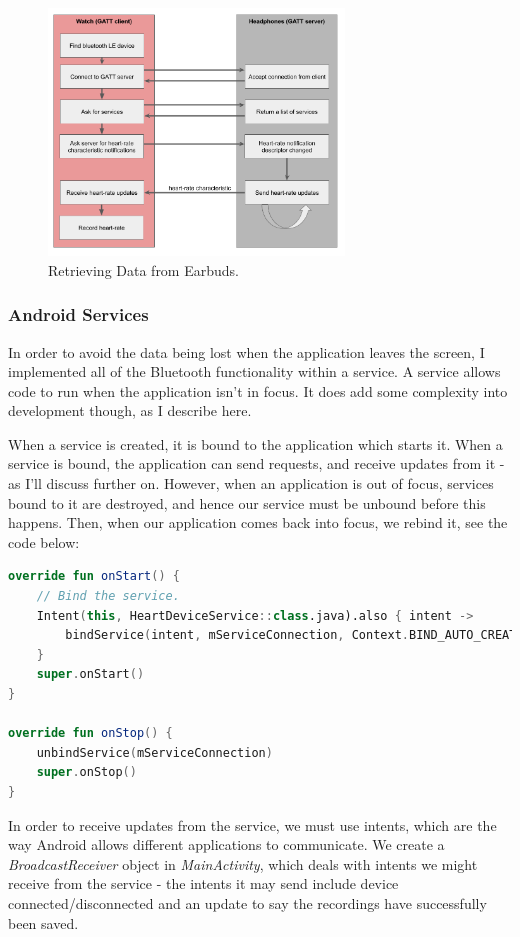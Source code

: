 \documentclass[12pt,a4paper,twoside,openright]{report}
\begin{document}
\begin{figure}[H]
	\centerline{\includegraphics[width=0.7\textwidth]{figs/gatt-flow.png}}
	\caption{Retrieving Data from Earbuds.}
	\label{fig:gatt-flow}
\end{figure}

\subsubsection{Android Services}

In order to avoid the data being lost when the application leaves the screen,
I implemented all of the Bluetooth functionality within a service. A service
allows code to run when the application isn't in focus. It does add some
complexity into development though, as I describe here.

When a service is created, it is bound to the application which starts it.
When a service is bound, the application can send requests, and receive
updates from it - as I'll discuss further on. However, when an application is
out of focus, services bound to it are destroyed, and hence our service must
be unbound before this happens. Then, when our application comes back into
focus, we rebind it, see the code below:

\begin{lstlisting}[language=Kotlin]
override fun onStart() {
    // Bind the service.
    Intent(this, HeartDeviceService::class.java).also { intent ->
        bindService(intent, mServiceConnection, Context.BIND_AUTO_CREATE)
    }
    super.onStart()
}

override fun onStop() {
    unbindService(mServiceConnection)
    super.onStop()
}
\end{lstlisting}

In order to receive updates from the service, we must use intents, which are
the way Android allows different applications to communicate. 
We create a \emph{BroadcastReceiver}
object in \emph{MainActivity}, which deals with intents we might receive from
the service - the intents it may send include device connected/disconnected
and an update to say the recordings have successfully been saved. 
\end{document}
